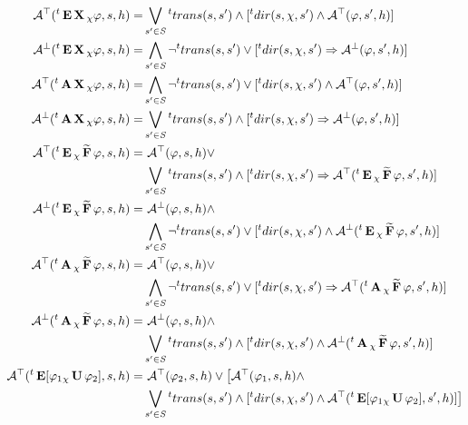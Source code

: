 \begin{align*}
	\assumeT(\withTime{t}\ctlE\dctlX{\chi} \varphi, s, h)  = & \bigvee_{s' \in \dtsS} \withTime{t}trans(s,s') \land [\withTime{t}dir(s, \chi, s') \land \assumeT(\varphi, s', h)] \\
	\assumeF(\withTime{t}\ctlE\dctlX{\chi} \varphi, s, h)  = & \bigwedge_{s' \in \dtsS} \neg\withTime{t}trans(s,s') \lor [\withTime{t}dir(s, \chi, s') \Rightarrow \assumeF(\varphi, s', h)] \\
	\assumeT(\withTime{t}\ctlA\dctlX{\chi} \varphi, s, h) = & \bigwedge_{s' \in \dtsS} \neg \withTime{t}trans(s,s') \lor [\withTime{t}dir(s, \chi, s') \land \assumeT(\varphi, s', h)] \\
	\assumeF(\withTime{t}\ctlA\dctlX{\chi} \varphi, s, h)  = & \bigvee_{s' \in \dtsS} \withTime{t}trans(s,s') \land [ \withTime{t}dir(s, \chi, s') \Rightarrow \assumeF(\varphi, s', h)] \\
	\assumeT(\withTime{t}\ctlE\dctlFW{\chi} \varphi, s, h)  = &\ \assumeT(\varphi, s, h) \lor \\
	 & \bigvee_{s' \in \dtsS} \withTime{t}trans(s,s') \land [\withTime{t}dir(s, \chi, s') \Rightarrow \assumeT(\withTime{t}\ctlE\dctlFW{\chi} \varphi, s', h) ] \\
	 \assumeF(\withTime{t}\ctlE\dctlFW{\chi} \varphi, s, h)  = &\ \assumeF(\varphi, s, h) \land \\
	 & \bigwedge_{s' \in \dtsS} \neg\withTime{t}trans(s,s') \lor [\withTime{t}dir(s, \chi, s') \land \assumeF(\withTime{t}\ctlE\dctlFW{\chi} \varphi, s', h) ] \\
	 \assumeT(\withTime{t}\ctlA\dctlFW{\chi} \varphi, s, h)  = &\ \assumeT(\varphi, s, h) \lor \\
	 & \bigwedge_{s' \in \dtsS} \neg\withTime{t}trans(s,s') \lor [\withTime{t}dir(s, \chi, s') \Rightarrow \assumeT(\withTime{t}\ctlA\dctlFW{\chi} \varphi, s', h) ] \\
	 \assumeF(\withTime{t}\ctlA\dctlFW{\chi} \varphi, s, h)  = &\ \assumeF(\varphi, s, h) \land \\
	 & \bigvee_{s' \in \dtsS} \withTime{t}trans(s,s') \land [\withTime{t}dir(s, \chi, s') \land \assumeF(\withTime{t}\ctlA\dctlFW{\chi} \varphi, s', h) ] \\
	\assumeT(\withTime{t}\ctlE[ \varphi_1 \dctlUl{\chi} \varphi_2], s, h) = &\ \assumeT(\varphi_2, s, h) \lor \big[ \assumeT(\varphi_1, s, h) \land \\
	& \bigvee_{s' \in \dtsS} \withTime{t}trans(s,s') \land [\withTime{t}dir(s, \chi, s') \land \assumeT(\withTime{t}\ctlE[ \varphi_1 \dctlUl{\chi} \varphi_2], s', h)] \big] \\

\end{align*}
